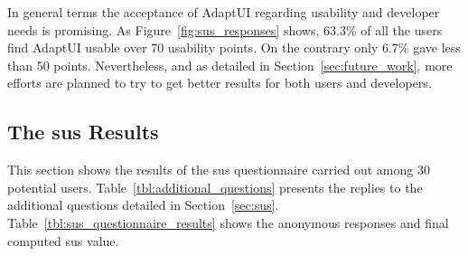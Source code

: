 In general terms the acceptance of AdaptUI regarding usability and developer
needs is promising. As Figure~\ref{fig:sus_responses} shows, 63.3\% of all 
the users find AdaptUI usable over 70 usability points. On the contrary only
6.7\% gave less than 50 points. Nevertheless, and as detailed in 
Section~\ref{sec:future_work}, more efforts are planned to try to get better
results for both users and developers.

\subsection{The \ac{sus} Results}
\label{sec:sus_results}

This section shows the results of the \ac{sus} questionnaire carried out among
30 potential users. Table~\ref{tbl:additional_questions} presents the replies 
to the additional questions detailed in Section~\ref{sec:sus}.
Table~\ref{tbl:sus_questionnaire_results} shows the anonymous responses and final
computed \ac{sus} value.

